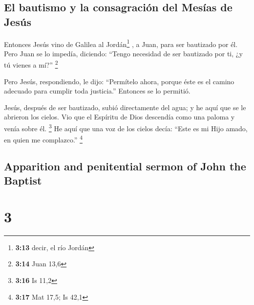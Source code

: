 \begin{paracol}{2}
\hypertarget{el-bautismo-y-la-consagraciuxf3n-del-mesuxedas-de-jesuxfas}{%
\subsection{El bautismo y la consagración del Mesías de
Jesús}\label{el-bautismo-y-la-consagraciuxf3n-del-mesuxedas-de-jesuxfas}}

 Entonces Jesús vino de Galilea al Jordán\footnote{\textbf{3:13}
  decir, el río Jordán} , a Juan, para ser bautizado por él.
 Pero Juan se lo impedía, diciendo: ``Tengo necesidad de
ser bautizado por ti, ¿y tú vienes a mí?'' \footnote{\textbf{3:14} Juan
  13,6}

 Pero Jesús, respondiendo, le dijo: ``Permítelo ahora,
porque éste es el camino adecuado para cumplir toda justicia.'' Entonces
se lo permitió.

 Jesús, después de ser bautizado, subió directamente del
agua; y he aquí que se le abrieron los cielos. Vio que el Espíritu de
Dios descendía como una paloma y venía sobre él. \footnote{\textbf{3:16}
  Is 11,2}  He aquí que una voz de los cielos decía:
``Este es mi Hijo amado, en quien me complazco.'' \footnote{\textbf{3:17}
  Mat 17,5; Is 42,1}

\switchcolumn
\begin{otherlanguage}{english}

\hypertarget{apparition-and-penitential-sermon-of-john-the-baptist}{%
\subsection{Apparition and penitential sermon of John the
Baptist}\label{apparition-and-penitential-sermon-of-john-the-baptist}}

\hypertarget{section-5}{%
\section{3}\label{section-5}}


\end{otherlanguage}
\end{paracol}
